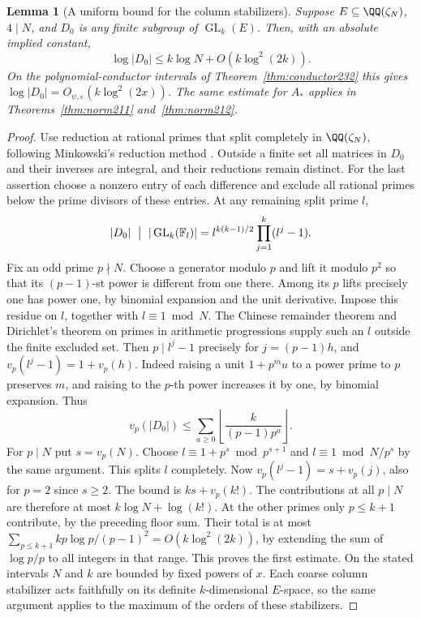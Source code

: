 \documentclass[a4paper,11pt]{article}
\newtheorem{lemma}[proposition]{Lemma}
\theoremstyle{definition}
\theoremstyle{remark}
\numberwithin{equation}{section}
\begin{document}
\begin{lemma}[A uniform bound for the column stabilizers]
\leavevmode\label{lem:conductorstabilizer532}
Suppose \(E\subseteq\QQ(\zeta_N)\), \(4\mid N\), and
\(D_0\) is any finite subgroup of \(\operatorname{GL}_k(E)\).
Then, with an absolute implied constant,
\[
           \log|D_0|\le k\log N+O(k\log^2(2k)).
\]
On the polynomial-conductor intervals of Theorem~\ref{thm:conductor232}
this gives \(\log|D_0|=O_{\psi,\varepsilon}(k\log^2(2x))\).
The same estimate for \(A_*\) applies in Theorems~\ref{thm:norm211}
and~\ref{thm:norm212}.
\end{lemma}
\begin{proof}
Use reduction at rational primes that split completely in
\(\QQ(\zeta_N)\), following Minkowski's reduction method
\cite{XVIII-XIII-IV-serre211}. Outside a finite set all matrices in \(D_0\)
and their inverses are integral, and their reductions remain
distinct. For the last assertion choose a nonzero entry of each
difference and exclude all rational primes below the prime
divisors of these entries. At any remaining split prime \(l\),
\[
          |D_0|\ \bigm|\ |\operatorname{GL}_k(\mathbb F_l)|
            =l^{k(k-1)/2}\prod_{j=1}^k(l^j-1).
\]
Fix an odd prime \(p\nmid N\). Choose a generator modulo \(p\)
and lift it modulo \(p^2\) so that its \((p-1)\)-st power is
different from one there. Among its \(p\) lifts precisely one
has power one, by binomial expansion and the unit derivative.
Impose this residue on \(l\), together with \(l\equiv1\bmod N\).
The Chinese remainder theorem and Dirichlet's theorem on primes
in arithmetic progressions supply such an \(l\) outside the
finite excluded set. Then \(p\mid l^j-1\) precisely for
\(j=(p-1)h\), and \(v_p(l^j-1)=1+v_p(h)\). Indeed raising a
unit \(1+p^m u\) to a power prime to \(p\) preserves \(m\),
and raising to the \(p\)-th power increases it by one, by
binomial expansion. Thus
\[
       v_p(|D_0|)\le\sum_{a\ge0}
               \left\lfloor\frac{k}{(p-1)p^a}\right\rfloor.
\]
For \(p\mid N\) put \(s=v_p(N)\). Choose
\(l\equiv1+p^s\bmod p^{s+1}\) and \(l\equiv1\bmod N/p^s\)
by the same argument. This splits \(l\) completely.
Now \(v_p(l^j-1)=s+v_p(j)\), also for \(p=2\) since \(s\ge2\).
The bound is \(ks+v_p(k!)\). The contributions at all \(p\mid N\)
are therefore at most \(k\log N+\log(k!)\). At the other primes
only \(p\le k+1\) contribute, by the preceding floor sum.
Their total is at most
\(\sum_{p\le k+1} kp\log p/(p-1)^2=O(k\log^2(2k))\),
by extending the sum of \(\log p/p\) to all integers in that
range. This proves the first estimate. On the stated intervals
\(N\) and \(k\) are bounded by fixed powers of \(x\).
Each coarse column stabilizer acts faithfully on its definite
\(k\)-dimensional \(E\)-space, so the same argument applies to
the maximum of the orders of these stabilizers.
\end{proof}
\end{document}
